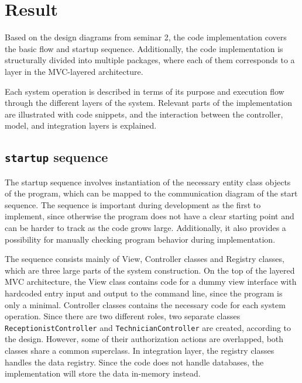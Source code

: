 \documentclass[a4paper]{scrartcl}
\begin{document}
\section{Result}
\label{sec:result}


Based on the design diagrams from seminar 2, the code implementation covers the basic flow and startup sequence. Additionally, the code implementation is structurally divided into multiple packages, where each of them corresponds to a layer in the MVC-layered architecture. 

Each system operation is described in terms of its purpose and execution flow through the different layers of the system. Relevant parts of the implementation are illustrated with code snippets, and the interaction between the controller, model, and integration layers is explained.

\subsection{\texttt{startup} sequence}

The startup sequence involves instantiation of the necessary entity class objects of the program, which can be mapped to the communication diagram of the start sequence. The sequence is important during development as the first to implement, since otherwise the program does not have a clear starting point and can be harder to track as the code grows large. Additionally, it also provides a possibility for manually checking program behavior during implementation. 

The sequence consists mainly of View, Controller classes and Registry classes, which are three large parts of the system construction. On the top of the layered MVC architecture, the View class contains code for a dummy view interface with hardcoded entry input and output to the command line, since the program is only a minimal. Controller classes contains the necessary code for each system operation. Since there are two different roles, two separate classes \texttt{ReceptionistController} and \texttt{TechnicianController} are created, according to the design. However, some of their authorization actions are overlapped, both classes share a common superclass. In integration layer, the registry classes handles the data registry. Since the code does not handle databases, the implementation will store the data in-memory instead.
\end{document}
